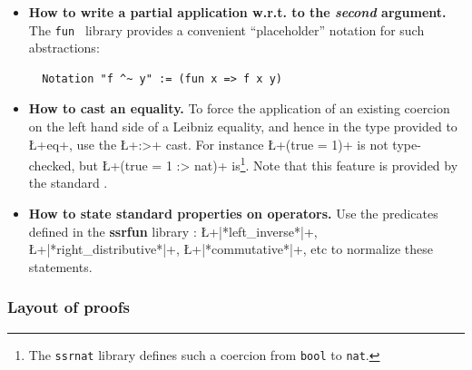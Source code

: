 \begin{itemize}
\item {\bf How to write a partial application w.r.t. to the {\it second}
    argument.}
The {\tt fun } library provides a convenient ``placeholder'' notation
for such abstractions:
\begin{lstlisting}
  Notation "f ^~ y" := (fun x => f x y)
\end{lstlisting}

\item {\bf How to cast an equality.} To force the application of an
  existing coercion on the left hand side of a Leibniz equality, and
  hence in the type provided to \L+eq+, use the \L+:>+ cast. For
  instance \L+(true = 1)+ is not type-checked, but \L+(true = 1 :> nat)+
  is\footnote{The {\tt ssrnat} library defines such a coercion from
    {\tt bool} to {\tt nat}.}. Note that this feature is provided by
  the standard \Coq{}.

\item {\bf How to state standard properties on operators.} Use the
  predicates defined in the {\bf ssrfun} library :
  \L+|*left_inverse*|+, \L+|*right_distributive*|+,
  \L+|*commutative*|+, etc to normalize these statements.


\end{itemize}

\subsubsection*{Layout of proofs}

